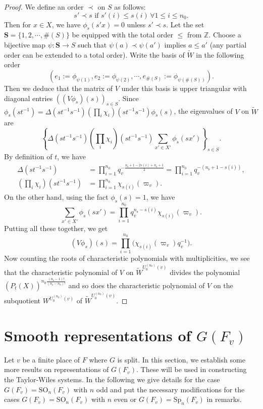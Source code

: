 \documentclass[12pt,oneside,reqno]{amsart}
\theoremstyle{plain}
\begin{document}
\begin{proof}
		
		
		We define an order $\prec$ on $S$ as follows:
		\[
		s'\prec s
		\text{ if }
		s'(i)\leq s(i)\, \forall 
		1\leq i \leq n_0.
		\]
		Then for $x\in X$, we have $\phi_s(s'x)=0$ unless $s'\prec s$. Let the set
		$\mathbf{S}=\{1,2,\cdots,\# (S)\}$ be equipped with the total order
		$\leq$ from $\mathbb{Z}$. Choose a bijective map $\psi\colon	\mathbf{S}\rightarrow S$ such that $\psi(a)\prec\psi(a')$ implies
		$a\leq a'$ (any partial order can be extended to a total order). Write the basis of $\widetilde{W}$ in the following order
		\[
		(e_1:=\phi_{\psi(1)},
		e_2:=\phi_{\psi(2)},\cdots,e_{\# (S)}:=\phi_{\psi(\# (S))}).
		\]
		Then we deduce that the matrix of $V$ under this basis is upper triangular with diagonal entries $((V\phi_s)(s))_{s\in S}$. Since $\phi_s(st^{-1})=\Delta(st^{-1}s^{-1})
		(\prod_i\chi_i)(st^{-1}s^{-1})\phi_s(s)$, the eigenvalues of $V$ on
		$\widetilde{W}$ are
		\[
		\left\{
		\Delta(st^{-1}s^{-1})
		(\prod_i\chi_i)(st^{-1}s^{-1})
		\sum_{x'\in X'}\phi_s(sx')
		\right\}_{s\in S}.
		\]
		By definition of $t$, we have
		\begin{align*}
			\Delta(st^{-1}s^{-1})
			&
			=
			\prod_{i=1}^{n_0}
			q_v^{-\frac{n_\mathrm{s}+1-2s(i)+n_\mathrm{s}+1}{2}}
			=
			\prod_{i=1}^{n_0}
			q_v^{-(n_\mathrm{s}+1-s(i))},
			\\
			(\prod_i\chi_i)(st^{-1}s^{-1})
			&
			=
			\prod_{i=1}^{n_0}\chi_{s(i)}(\varpi_v).
		\end{align*}
		On the other hand, using the fact $\phi_s(s)=1$, we have
		\[
		\sum_{x'\in X'}\phi_s(sx')
		=
		\prod_{i=1}^{n_0}q_v^{n_\mathrm{s}-s(i)}
		\chi_{s(i)}(\varpi_v).
		\]
		Putting all these together, we get
		\[
		(V\phi_s)(s)
		=
		\prod_{i=1}^{n_0}
		\big(
		\chi_{s(i)}(\varpi_v)q_v^{-1}
		\big).
		\]
		Now counting the roots of characteristic polynomials with multiplicities,
		we see that the characteristic polynomial of $V$ on $\widetilde{W}^{U_0^{(n_0)}(v)}$ divides the polynomial
		$(P_{\underline{t}}(X))^{n_0\frac{(n_\mathrm{s}-1)!}{(n_\mathrm{s}-n_0)!}}$
		and so does the characteristic polynomial of $V$ on the subquotient
		$W^{U_0^{(n_0)}(v)}$ of $\widetilde{W}^{U_0^{(n_0)}(v)}$.	  	
	\end{proof}
	
	
	\section{Smooth representations of $ G(F_v)$}
	\label{smooth representations of G(F_v)}
	Let
	$v$ be a finite place of $F$
	where
	$G$ is split.
	In this section,
	we establish some more
	results on representations of
	$ G(F_v)$.
	These will be used in
	constructing the Taylor-Wiles systems.
	In the following
	we give details for the case
	$G(F_v)=\mathrm{SO}_n(F_v)$ with $n$ odd
	and put the necessary modifications for the cases $G(F_v)=\mathrm{SO}_n(F_v)$ with $n$ even or $G(F_v)=\mathrm{Sp}_n(F_v)$
	in remarks.
	
\end{document}
